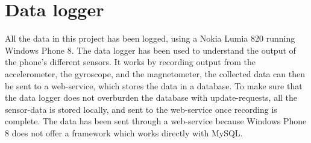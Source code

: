 \section{Data logger}\label{section:datalogger}
All the data in this project has been logged, using a Nokia Lumia 820 running Windows Phone 8.
The data logger has been used to understand the output of the phone's different sensors.
It works by recording output from the accelerometer, the gyroscope, and the magnetometer, the collected data can then be sent to a web-service, which stores the data in a database.
To make sure that the data logger does not overburden the database with update-requests, all the sensor-data is stored locally, and sent to the web-service once recording is complete.
The data has been sent through a web-service because Windows Phone 8 does not offer a framework which works directly with MySQL.